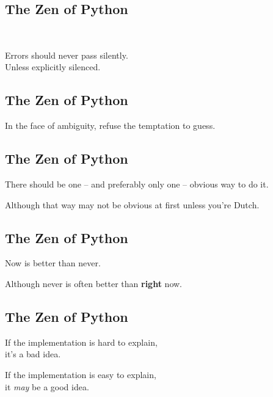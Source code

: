 \documentclass[xga]{xdvislides}
\begin{document}
\subsection{The Zen of Python}
\\
\begin{center}
    Errors should never pass silently. \\
\addvspace{.5in}
    Unless explicitly silenced.
\end{center}

\subsection{The Zen of Python}
\begin{center}
    In the face of ambiguity, refuse the temptation to guess.
\end{center}

\subsection{The Zen of Python}
\begin{center}
    There should be one -- and preferably only one -- obvious way to do it.

\addvspace{.5in}

    Although that way may not be obvious at first unless you're Dutch. \\
\end{center}


\subsection{The Zen of Python}
\begin{center}
    Now is better than never.  \\

\addvspace{.5in}

    Although never is often better than {\bf right} now.
\end{center}

\subsection{The Zen of Python}
\begin{center}
    If the implementation is hard to explain, \\
it's a bad idea. \\

\addvspace{.5in}

    If the implementation is easy to explain, \\
	it {\em may} be a good idea.
\end{center}
\end{document}
